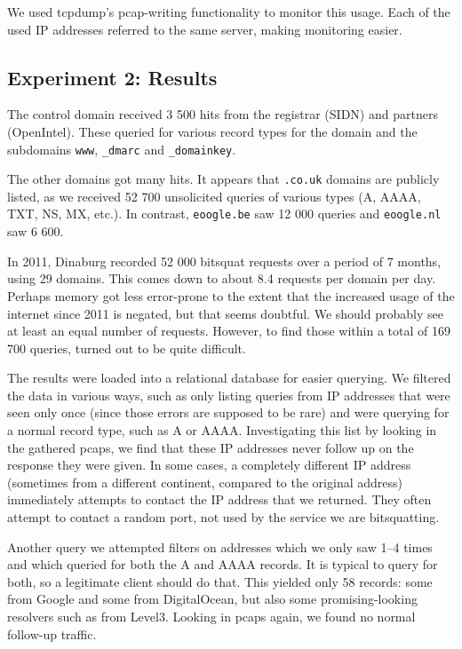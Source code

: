 \documentclass[conference]{IEEEtran}
\begin{document}
We used tcpdump's pcap-writing functionality to monitor this usage. Each of the
used IP addresses referred to the same server, making monitoring easier.


\subsection{Experiment 2: Results}

The control domain received 3 500 hits from the registrar (SIDN) and partners
(OpenIntel). These queried for various record types for the domain and the
subdomains \texttt{www}, \texttt{\_dmarc} and \texttt{\_domainkey}.

The other domains got many hits. It appears that \texttt{.co.uk} domains are
publicly listed, as we received 52 700 unsolicited queries of various types (A,
AAAA, TXT, NS, MX, etc.). In contrast, \texttt{eoogle.be} saw 12 000 queries
and \texttt{eoogle.nl} saw 6 600.

In 2011, Dinaburg\cite{dinaburg2011bitsquatting} recorded 52 000 bitsquat
requests over a period of 7 months, using 29 domains. This comes down to about
8.4 requests per domain per day. Perhaps memory got less error-prone to the
extent that the increased usage of the internet since 2011 is negated, but that
seems doubtful. We should probably see at least an equal number of requests.
However, to find those within a total of 169 700 queries, turned out to be
quite difficult.

The results were loaded into a relational database for easier querying. We
filtered the data in various ways, such as only listing queries from IP
addresses that were seen only once (since those errors are supposed to be rare)
and were querying for a normal record type, such as A or AAAA. Investigating
this list by looking in the gathered pcaps, we find that these IP addresses
never follow up on the response they were given. In some cases, a completely
different IP address (sometimes from a different continent, compared to the
original address) immediately attempts to contact the IP address that we
returned. They often attempt to contact a random port, not used by the service
we are bitsquatting.

Another query we attempted filters on addresses which we only saw 1--4 times
and which queried for both the A and AAAA records. It is typical to query for
both, so a legitimate client should do that. This yielded only 58 records: some
from Google and some from DigitalOcean, but also some promising-looking
resolvers such as from Level3. Looking in pcaps again, we found no normal
follow-up traffic.
\end{document}
